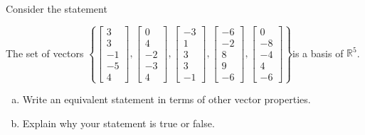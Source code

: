 
\begin{exerciseStatement}


Consider the statement 
\begin{center}\begin{minipage}{0.8\textwidth}
 The set of vectors \( \left\{ \left[\begin{array}{c}
3 \\
3 \\
-1 \\
-5 \\
4
\end{array}\right] , \left[\begin{array}{c}
0 \\
4 \\
-2 \\
-3 \\
4
\end{array}\right] , \left[\begin{array}{c}
-3 \\
1 \\
3 \\
3 \\
-1
\end{array}\right] , \left[\begin{array}{c}
-6 \\
-2 \\
8 \\
9 \\
-6
\end{array}\right] , \left[\begin{array}{c}
0 \\
-8 \\
-4 \\
4 \\
-6
\end{array}\right] \right\} \)is a basis of \(\mathbb{R}^5\). 
\end{minipage}\end{center}
    


\begin{enumerate}[(a)]
\item  Write an equivalent statement in terms of other vector properties.
\item  Explain why your statement is true or false.
\end{enumerate}
    
\end{exerciseStatement}
    
